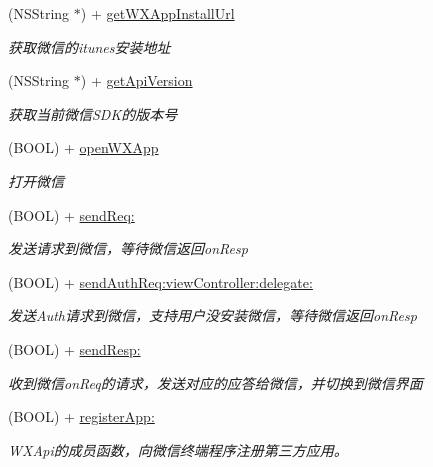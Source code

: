 \begin{DoxyCompactItemize}
(N\+S\+String $\ast$) + \mbox{\hyperlink{interface_w_x_api_a5e8a0217bef24a40c7d2edd9b3c5cdb9}{get\+W\+X\+App\+Install\+Url}}
\begin{DoxyCompactList}\small\item\em 获取微信的itunes安装地址 \end{DoxyCompactList}\item 
(N\+S\+String $\ast$) + \mbox{\hyperlink{interface_w_x_api_a5995d42d92822722f7ebf11663db2d33}{get\+Api\+Version}}
\begin{DoxyCompactList}\small\item\em 获取当前微信\+S\+D\+K的版本号 \end{DoxyCompactList}\item 
(B\+O\+OL) + \mbox{\hyperlink{interface_w_x_api_ac238ad8f1aa670ea9b26836f77701dc2}{open\+W\+X\+App}}
\begin{DoxyCompactList}\small\item\em 打开微信 \end{DoxyCompactList}\item 
(B\+O\+OL) + \mbox{\hyperlink{interface_w_x_api_a1a30bc4f39815920b6e45901375bee8e}{send\+Req\+:}}
\begin{DoxyCompactList}\small\item\em 发送请求到微信，等待微信返回on\+Resp \end{DoxyCompactList}\item 
(B\+O\+OL) + \mbox{\hyperlink{interface_w_x_api_a646e42926ec7378a087674e54150b2c9}{send\+Auth\+Req\+:view\+Controller\+:delegate\+:}}
\begin{DoxyCompactList}\small\item\em 发送\+Auth请求到微信，支持用户没安装微信，等待微信返回on\+Resp \end{DoxyCompactList}\item 
(B\+O\+OL) + \mbox{\hyperlink{interface_w_x_api_ab026294e5601cd15d7b792c3de7b81d5}{send\+Resp\+:}}
\begin{DoxyCompactList}\small\item\em 收到微信on\+Req的请求，发送对应的应答给微信，并切换到微信界面 \end{DoxyCompactList}\item 
(B\+O\+OL) + \mbox{\hyperlink{interface_w_x_api_a84341d7a4aea16c2fd6e74708a569564}{register\+App\+:}}
\begin{DoxyCompactList}\small\item\em W\+X\+Api的成员函数，向微信终端程序注册第三方应用。 \end{DoxyCompactList}\item 

\end{DoxyCompactItemize}
